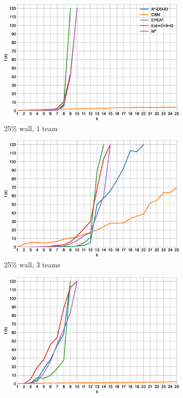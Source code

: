 \documentclass[english,10pt]{article}
\begin{document}
	\begin{figure}[b]
		\centering
		\begin{subfigure}{0.44\textwidth}
			\centering
			\includegraphics[width=\linewidth]{img/results/relative-comparison/25-1}
			\caption{25\% wall, 1 team}
			\label{fig:r-25-1}
		\end{subfigure}
		\begin{subfigure}{0.44\textwidth}
			\centering
			\includegraphics[width=\linewidth]{img/results/relative-comparison/25-3}
			\caption{25\% wall, 3 teams}
			\label{fig:r-25-3}
		\end{subfigure}
		\begin{subfigure}{0.44\textwidth}
			\centering
			\includegraphics[width=\linewidth]{img/results/relative-comparison/75-1}

\end{subfigure}
\end{figure}
\end{document}
